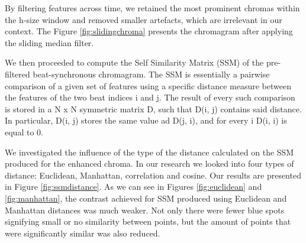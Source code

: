 By filtering features across time, we retained the most prominent chromas within the h-size window and removed smaller artefacts, which are irrelevant in our context. The Figure \ref{fig:slidingchroma} presents the chromagram after applying the sliding median filter.

We then proceeded to compute the Self Similarity Matrix (SSM) of the pre-filtered beat-synchronous chromagram. The SSM is essentially a pairwise comparison of a given set of features using a specific distance measure between the features of the two beat indices i and j. The result of every such comparison is stored in a N x N symmetric matrix D, such that D(i, j) contains said distance. In particular, D(i, j) stores the same value ad D(j, i), and for every i D(i, i) is equal to 0.

We investigated the influence of the type of the distance calculated on the SSM produced for the enhanced chroma. In our research we looked into four types of distance: Euclidean, Manhattan, correlation and cosine. Our results are presented in Figure \ref{fig:ssmdistance}. 
As we can see in Figures \ref{fig:euclidean} and \ref{fig:manhattan}, the contrast achieved for SSM produced using Euclidean and Manhattan distances was much weaker. Not only there were fewer blue spots signifying small or no similarity between points, but the amount of points that were significantly similar was also reduced.


